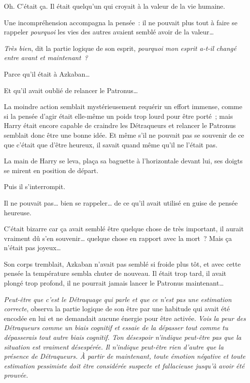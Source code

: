 Oh. C'était ça. Il était quelqu'un qui croyait à la valeur de la vie humaine.

 Une incompréhension accompagna la pensée~: il ne pouvait plus tout à faire se rappeler \emph{pourquoi} les vies des autres avaient semblé avoir de la valeur…

\emph{Très bien}, dit la partie logique de son esprit, \emph{pourquoi mon esprit a-t-il changé entre avant et maintenant~?}

Parce qu'il était à Azkaban…

Et qu'il avait oublié de relancer le Patronus…

La moindre action semblait mystérieusement requérir un effort immense, comme si la pensée d'agir était elle-même un poids trop lourd pour être porté~; mais Harry était encore capable de craindre les Détraqueurs et relancer le Patronus semblait donc être une bonne idée. Et même s'il ne pouvait pas se souvenir de ce que c'était que d'être heureux, il savait quand même qu'il ne l'était pas.

La main de Harry se leva, plaça sa baguette à l'horizontale devant lui, ses doigts se mirent en position de départ.

Puis il s'interrompit.

Il ne pouvait pas… bien se rappeler… de ce qu'il avait utilisé en guise de pensée heureuse.

C'était bizarre car ça avait semblé être quelque chose de très important, il aurait vraiment dû s'en souvenir… quelque chose en rapport avec la mort~? Mais ça n'était pas joyeux…

Son corps tremblait, Azkaban n'avait pas semblé si froide plus tôt, et avec cette pensée la température sembla chuter de nouveau. Il était trop tard, il avait plongé trop profond, il ne pourrait jamais lancer le Patronus maintenant…

\emph{Peut-être que c'est le Détraquage qui parle et que ce n'est pas une estimation correcte}, observa la partie logique de son être par une habitude qui avait été encodée en lui et ne demandait aucune énergie pour être activée. \emph{Vois la peur des Détraqueurs comme un biais cognitif et essaie de la dépasser tout comme tu dépasserais tout autre biais cognitif. Ton désespoir n'indique peut-être pas que la situation est vraiment désespérée. Il n'indique peut-être rien d'autre que la présence de Détraqueurs. À partir de maintenant, toute émotion négative et toute estimation pessimiste doit être considérée suspecte et fallacieuse jusqu'à avoir été prouvée.}


